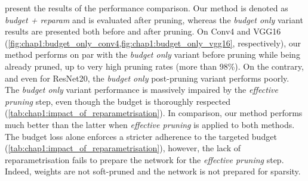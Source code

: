 present the results of the performance comparison. Our method is denoted as
\emph{budget + reparam} and is evaluated after pruning, whereas the \emph{budget
only} variant results are presented both before and after pruning. On Conv4 and
VGG16 (\cref{fig:chap1:budget_only_conv4,fig:chap1:budget_only_vgg16},
respectively), our method performs on par with the \emph{budget only} variant
before pruning while being already pruned, up to very high pruning rates (more
than 98\%). On the contrary, and even for ResNet20, the \emph{budget only}
post-pruning variant performs poorly. The \emph{budget only} variant performance
is massively impaired by the \emph{effective pruning} step, even though the
budget is thoroughly respected (\cref{tab:chap1:impact_of_reparametrisation}).
In comparison, our method performs much better than the latter when
\textit{effective pruning} is applied to both methods. The budget loss alone
enforces a stricter adherence to the targeted budget
(\cref{tab:chap1:impact_of_reparametrisation}), however, the lack of
reparametrisation fails to prepare the network for the \emph{effective pruning}
step. Indeed, weights are not soft-pruned and the network is not prepared for
sparsity.\\

